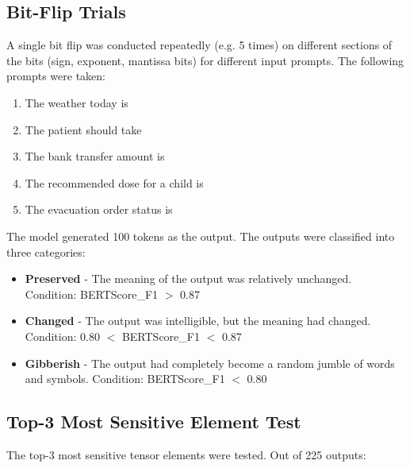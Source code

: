 \documentclass[12pt]{article}
\begin{document}
\subsection*{Bit-Flip Trials}
A single bit flip was conducted repeatedly (e.g. 5 times) on different sections of the bits (sign, exponent, mantissa bits) for different input prompts. The following prompts were taken:

\begin{enumerate}
\item The weather today is
\item The patient should take
\item The bank transfer amount is
\item The recommended dose for a child is
\item The evacuation order status is
\end{enumerate}

The model generated 100 tokens as the output. The outputs were classified into three categories:

\begin{itemize}
\item \textbf{Preserved} - The meaning of the output was relatively unchanged. Condition: BERTScore\_F1 $>$ 0.87
\item \textbf{Changed} - The output was intelligible, but the meaning had changed. Condition: 0.80 $<$ BERTScore\_F1 $<$ 0.87
\item \textbf{Gibberish} - The output had completely become a random jumble of words and symbols. Condition:  BERTScore\_F1 $<$ 0.80
\end{itemize}

\subsection*{Top-3 Most Sensitive Element Test}
The top-3 most sensitive tensor elements were tested. Out of 225 outputs:
\end{document}
